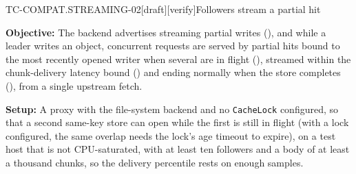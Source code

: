 \begin{requirement}{TC-COMPAT.STREAMING-02}[draft][verify]{Followers stream a partial hit}


  \textbf{Objective:} The backend advertises streaming partial writes
  (), and while a leader writes an object,
  concurrent requests are served by partial hits bound to the most recently
  opened writer when several are in flight (),
  streamed within the chunk-delivery latency bound
  () and ending normally when the store
  completes (), from a single upstream fetch.

  \textbf{Setup:} A proxy with the file-system backend and no
  \texttt{CacheLock} configured, so that a second same-key store can open
  while the first is still in flight (with a lock configured, the same
  overlap needs the lock's age timeout to expire), on a test host that is not
  CPU-saturated, with at least ten followers and a body of at least a
  thousand chunks, so the delivery percentile rests on enough samples.


\end{requirement}
